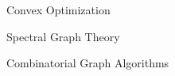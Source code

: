 \documentclass[11pt,landscape,a4paper]{article}
\newcommand{\HEADER}[1]{\begin{tcolorbox}
    \centering
    #1
\end{tcolorbox}}
\begin{document}
\small
\begin{multicols*}{3}


\HEADER{Convex Optimization}


\HEADER{Spectral Graph Theory}
















\HEADER{Combinatorial Graph Algorithms}



\end{multicols*}
\end{document}

